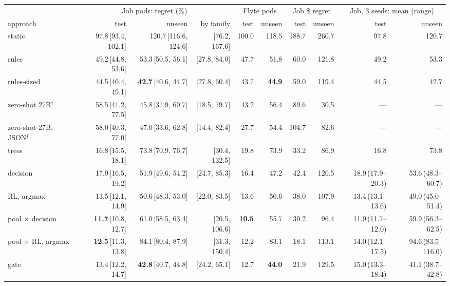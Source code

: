 \begin{tabular}{@{}lrrrrrrrrr@{}}
\toprule
& \multicolumn{3}{c}{Job pods: regret (\%)} & \multicolumn{2}{c}{Flyte pods} & \multicolumn{2}{c}{Job \$ regret} & \multicolumn{2}{c}{Job, 3 seeds: mean (range)} \\
\cmidrule(lr){2-4}\cmidrule(lr){5-6}\cmidrule(lr){7-8}\cmidrule(l){9-10}
approach & test & unseen & by family & test & unseen & test & unseen & test & unseen \\
\midrule
static & 97.8\,{\scriptsize[93.4, 102.1]} & 120.7\,{\scriptsize[116.6, 124.6]} & {\scriptsize[76.2, 167.6]} & 100.0 & 118.5 & 188.7 & 260.7 & 97.8 & 120.7 \\
rules & 49.2\,{\scriptsize[44.8, 53.6]} & 53.3\,{\scriptsize[50.5, 56.1]} & {\scriptsize[27.8, 84.0]} & 47.7 & 51.8 & 60.0 & 121.8 & 49.2 & 53.3 \\
rules-sized & 44.5\,{\scriptsize[40.4, 49.1]} & \textbf{42.7}\,{\scriptsize[40.6, 44.7]} & {\scriptsize[27.8, 60.4]} & 43.7 & \textbf{44.9} & 59.0 & 119.4 & 44.5 & 42.7 \\
zero-shot 27B$^\dagger$ & 58.5\,{\scriptsize[41.2, 77.5]} & 45.8\,{\scriptsize[31.9, 60.7]} & {\scriptsize[18.5, 79.7]} & 43.2 & 56.4 & 89.6 & 30.5 & --- & --- \\
zero-shot 27B, JSON$^\dagger$ & 58.0\,{\scriptsize[40.3, 77.0]} & 47.0\,{\scriptsize[33.6, 62.8]} & {\scriptsize[14.4, 82.4]} & 27.7 & 54.4 & 104.7 & 82.6 & --- & --- \\
trees & 16.8\,{\scriptsize[15.5, 18.1]} & 73.8\,{\scriptsize[70.9, 76.7]} & {\scriptsize[30.4, 132.5]} & 19.8 & 73.9 & 33.2 & 86.9 & 16.8 & 73.8 \\
decision & 17.9\,{\scriptsize[16.5, 19.2]} & 51.9\,{\scriptsize[49.6, 54.2]} & {\scriptsize[24.7, 85.3]} & 16.4 & 47.2 & 42.4 & 120.5 & 18.9\,{\scriptsize(17.9--20.3)} & 53.6\,{\scriptsize(48.3--60.7)} \\
RL, argmax & 13.5\,{\scriptsize[12.1, 14.9]} & 50.6\,{\scriptsize[48.3, 53.0]} & {\scriptsize[22.0, 83.5]} & 13.6 & 50.6 & 38.0 & 107.9 & 13.4\,{\scriptsize(13.1--13.6)} & 49.0\,{\scriptsize(45.0--51.4)} \\
pool $\times$ decision & \textbf{11.7}\,{\scriptsize[10.8, 12.7]} & 61.0\,{\scriptsize[58.5, 63.4]} & {\scriptsize[26.5, 106.6]} & \textbf{10.5} & 55.7 & 30.2 & 96.4 & 11.9\,{\scriptsize(11.7--12.0)} & 59.9\,{\scriptsize(56.3--62.5)} \\
pool $\times$ RL, argmax & \textbf{12.5}\,{\scriptsize[11.3, 13.8]} & 84.1\,{\scriptsize[80.4, 87.9]} & {\scriptsize[31.3, 150.4]} & 12.2 & 83.1 & 18.1 & 113.1 & 14.0\,{\scriptsize(12.1--17.5)} & 94.6\,{\scriptsize(83.5--116.0)} \\
gate & 13.4\,{\scriptsize[12.2, 14.7]} & \textbf{42.8}\,{\scriptsize[40.7, 44.8]} & {\scriptsize[24.2, 65.1]} & 12.7 & \textbf{44.0} & 21.9 & 129.5 & 15.0\,{\scriptsize(13.3--18.4)} & 41.1\,{\scriptsize(38.7--42.8)} \\
\bottomrule
\end{tabular}

